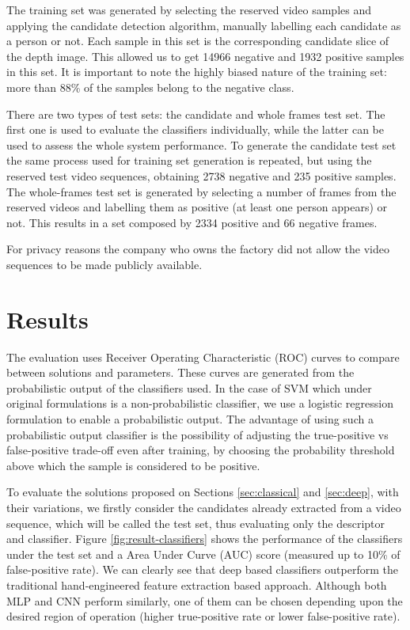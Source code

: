The training set was generated by selecting the reserved video samples and applying the candidate detection algorithm, manually labelling each candidate as a person or not. Each sample in this set is the corresponding candidate slice of the depth image. This allowed us to get 14966 negative and 1932 positive samples in this set. It is important to note the highly biased nature of the training set: more than 88\% of the samples belong to the negative class.

There are two types of test sets: the candidate and whole frames test set. The first one is used to evaluate the classifiers individually, while the latter can be used to assess the whole system performance. To generate the candidate test set the same process used for training set generation is repeated, but using the reserved test video sequences, obtaining 2738 negative and 235 positive samples. The whole-frames test set is generated by selecting a number of frames from the reserved videos and labelling them as positive (at least one person appears) or not. This results in a set composed by 2334 positive and 66 negative frames.

For privacy reasons the company who owns the factory did not allow the video sequences to be made publicly available.

\section{Results}
\label{sec:results}

    The evaluation uses Receiver Operating Characteristic (ROC) curves \cite{evaluationMetrics} to compare between solutions and parameters. These curves are generated from the probabilistic output of the classifiers used. In the case of SVM which under original formulations is a non-probabilistic classifier, we use a logistic regression formulation \cite{svmProbabilisticOutput} to enable a probabilistic output. The advantage of using such a probabilistic output classifier is the possibility of adjusting the true-positive vs false-positive trade-off even after training, by choosing the probability threshold above which the sample is considered to be positive.

    To evaluate the solutions proposed on Sections \ref{sec:classical} and \ref{sec:deep}, with their variations, we firstly consider the candidates already extracted from a video sequence, which will be called the test set, thus evaluating only the descriptor and classifier. Figure \ref{fig:result-classifiers} shows the performance of the classifiers under the test set and a Area Under Curve (AUC) score \cite{evaluationMetrics} (measured up to 10\% of false-positive rate). We can clearly see that deep based classifiers outperform the traditional hand-engineered feature extraction based approach. Although both MLP and CNN perform similarly, one of them can be chosen depending upon the desired region of operation (higher true-positive rate or lower false-positive rate).

